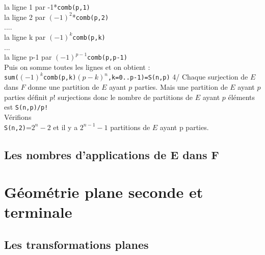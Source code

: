 \documentclass[a4paper,11pt]{book}
\begin{document}
la ligne 1 par -1*{\tt comb(p,1)} \\
la ligne 2 par $(-1)^2$*{\tt comb(p,2)}\\
....\\
la ligne k par $(-1)^k${\tt comb(p,k)}\\
...\\
la ligne p-1 par $(-1)^{p-1}${\tt comb(p,p-1)}\\
Puis on somme toutes les lignes et on obtient :\\
{\tt sum($(-1)^k$comb(p,k)$(p-k)^n$,k=0..p-1)=S(n,p)} 
4/ Chaque surjection de $E$ dans $F$ donne une partition de $E$ ayant $p$ 
parties. Mais une partition de $E$ ayant $p$ parties d\'efinit $p!$ surjections
donc le nombre de partitions de $E$ ayant $p$ \'el\'ements est {\tt S(n,p)/p!}\\
V\'erifions \\
{\tt S(n,2)}=$2^n-2$ et il y a $2^{n-1}-1$ partitions de $E$ ayant p parties.



\section{Les nombres d'applications de E dans F}\chapter{G\'eom\'etrie plane seconde et terminale}
\section{Les transformations planes}
\end{document}
